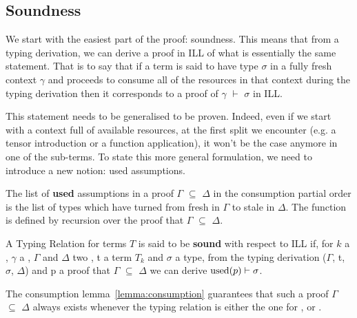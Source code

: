 \subsection{Soundness}

We start with the easiest part of the proof: soundness. This means that from
a typing derivation, we can derive a proof in ILL of what is essentially the
same statement. That is to say that if a term is said to have type \ensuremath{\sigma} in a fully
fresh context \ensuremath{\gamma} and proceeds to consume all of the resources in that context
during the typing derivation then it corresponds to a proof of \ensuremath{\gamma} \ensuremath{\vdash} \ensuremath{\sigma} in ILL.

This statement needs to be generalised to be proven. Indeed, even if we start
with a context full of available resources, at the first split we encounter
(e.g. a tensor introduction or a function application), it won't be the case
anymore in one of the sub-terms. To state this more general formulation,
we need to introduce a new notion: used assumptions.

\begin{definition}The list of \textbf{used} assumptions in a proof \ensuremath{\Gamma} \ensuremath{\subseteq} \ensuremath{\Delta} in
the consumption partial order is the list of types which have turned from
fresh in \ensuremath{\Gamma} to stale in \ensuremath{\Delta}. The \used{\cdot} function is defined by recursion
over the proof that \ensuremath{\Gamma} \ensuremath{\subseteq} \ensuremath{\Delta}.
\end{definition}

\begin{definition}A Typing Relation \TR{} for terms $T$ is said to be \textbf{sound}
with respect to ILL if, for $k$ a \Nat{}, \ensuremath{\gamma} a , \ensuremath{\Gamma} and \ensuremath{\Delta} two \Usages{\ensuremath{\gamma}},
t a term $T_k$ and \ensuremath{\sigma} a type, from the typing derivation \TR{}(\ensuremath{\Gamma}, t, \ensuremath{\sigma}, \ensuremath{\Delta}) and p a
proof that \ensuremath{\Gamma} \ensuremath{\subseteq} \ensuremath{\Delta} we can derive $\text{used}(p) \vdash \sigma$.
\end{definition}

\begin{remark}The consumption lemma~\ref{lemma:consumption} guarantees that such
a proof \ensuremath{\Gamma} \ensuremath{\subseteq} \ensuremath{\Delta} always exists whenever the typing relation is either the one for
\Var{}, \Inferable{} or \Checkable{}.
\end{remark}

